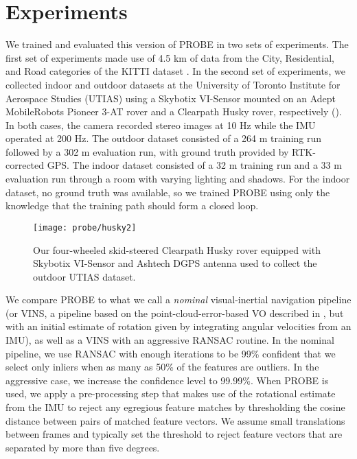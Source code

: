 \section{Experiments}
We trained and evaluated this version of PROBE in two sets of experiments.
The first set of experiments made use of 4.5 km of data from the City, Residential, and Road categories of the KITTI dataset \citep{Geiger2012-fq}.
In the second set of experiments, we collected indoor and outdoor datasets at the University of Toronto Institute for Aerospace Studies (UTIAS) using a Skybotix VI-Sensor mounted on an Adept MobileRobots Pioneer 3-AT rover and a Clearpath Husky rover, respectively ().
In both cases, the camera recorded stereo images at 10 Hz while the IMU operated at 200 Hz.
The outdoor dataset consisted of a 264 m training run followed by a 302 m evaluation run, with ground truth provided by RTK-corrected GPS.
The indoor dataset consisted of a 32 m training run and a 33 m evaluation run through a room with varying lighting and shadows.
For the indoor dataset, no ground truth was available, so we trained PROBE using only the knowledge that the training path should form a closed loop.

\begin{figure}
    \centering
    \texttt{[image: probe/husky2]}
    \caption{Our four-wheeled skid-steered Clearpath Husky rover equipped with Skybotix VI-Sensor and Ashtech DGPS antenna used to collect the outdoor UTIAS dataset.}
    \label{fig:probe_huskypic}
\end{figure}

We compare PROBE to what we call a \textit{nominal} visual-inertial navigation pipeline (or VINS, a pipeline based on the point-cloud-error-based VO described in , but with an initial estimate of rotation given by integrating angular velocities from an IMU), as well as a VINS with an aggressive RANSAC routine. In the nominal pipeline, we use RANSAC with enough iterations to be 99\% confident that we select only inliers when as many as 50\% of the features are outliers. In the aggressive case, we increase the confidence level to 99.99\%. When PROBE is used, we apply a pre-processing step that makes use of the rotational estimate from the IMU to reject any egregious feature matches by thresholding the cosine distance between pairs of matched feature vectors. We assume small translations between frames and typically set the threshold to reject feature vectors that are separated by more than five degrees. 

